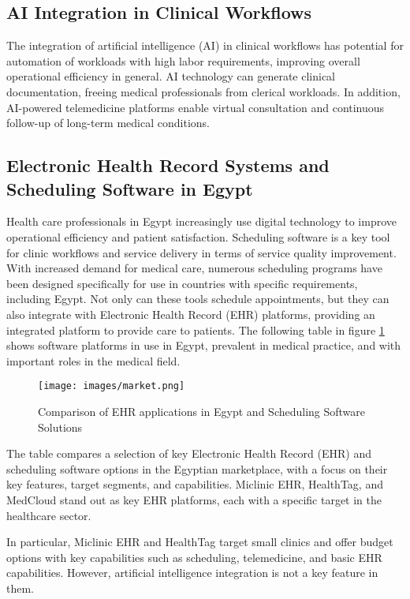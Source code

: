 \subsection{AI Integration in Clinical Workflows}
The integration of artificial intelligence (AI) in clinical workflows has potential for automation of workloads with high labor requirements, improving overall operational efficiency in general. AI technology can generate clinical documentation, freeing medical professionals from clerical workloads. In addition, AI-powered telemedicine platforms enable virtual consultation and continuous follow-up of long-term medical conditions.

\subsection{Electronic Health Record Systems and Scheduling Software in Egypt}

Health care professionals in Egypt increasingly use digital technology to improve operational efficiency and patient satisfaction. Scheduling software is a key tool for clinic workflows and service delivery in terms of service quality improvement. With increased demand for medical care, numerous scheduling programs have been designed specifically for use in countries with specific requirements, including Egypt. Not only can these tools schedule appointments, but they can also integrate with Electronic Health Record (EHR) platforms, providing an integrated platform to provide care to patients. The following table in figure \ref{comparison} shows software platforms in use in Egypt, prevalent in medical practice, and with important roles in the medical field.
\begin{figure}[h]
    \centering
    \texttt{[image: images/market.png]}
    \caption{Comparison of EHR applications in Egypt and Scheduling Software Solutions}
    \label{comparison}
\end{figure}

The table compares a selection of key Electronic Health Record (EHR) and scheduling software options in the Egyptian marketplace, with a focus on their key features, target segments, and capabilities. Miclinic EHR, HealthTag, and MedCloud stand out as key EHR platforms, each with a specific target in the healthcare sector. 

In particular, Miclinic EHR and HealthTag target small clinics and offer budget options with key capabilities such as scheduling, telemedicine, and basic EHR capabilities. However, artificial intelligence integration is not a key feature in them. 

